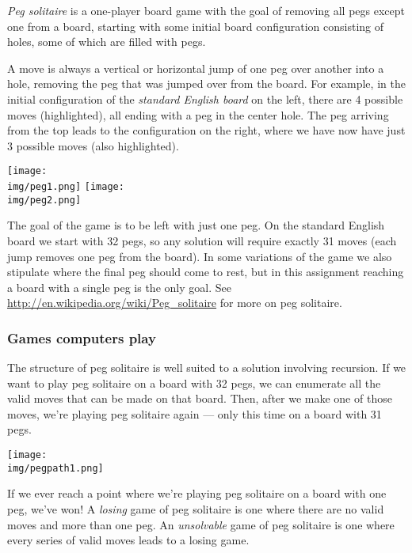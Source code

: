 \documentclass[12pt]{exam}
\begin{document}
\emph{Peg solitaire} is a one-player board game with the goal of
removing all pegs except one from a board, starting with some initial
board configuration consisting of holes, some of which are filled with
pegs.

A move is always a vertical or horizontal jump of one peg over another
into a hole, removing the peg that was jumped over from the board.
For example, in the initial configuration of the \emph{standard
  English board} on the left, there are 4 possible moves
(highlighted), all ending with a peg in the center hole.  The peg
arriving from the top leads to the configuration on the right, where
we have now have just 3 possible moves (also highlighted).
\begin{center}
\texttt{[image: \\img/peg1.png]}
\hspace{3em}
\texttt{[image: \\img/peg2.png]}
\end{center}

The goal of the game is to be left with just one peg. On the standard
English board we start with 32 pegs, so any solution will require
exactly 31 moves (each jump removes one peg from the board).  In some
variations of the game we also stipulate where the final peg should
come to rest, but in this assignment reaching a board with a single
peg is the only goal.  See
\url{http://en.wikipedia.org/wiki/Peg_solitaire} for more on peg
solitaire.


\enlargethispage{5ex}
\subsubsection*{Games computers play}

The structure of peg solitaire is well suited to a solution involving
recursion.  If we want to play peg solitaire on a board with 32 pegs,
we can enumerate all the valid moves that can be made on that
board. Then, after we make one of those moves, we're playing peg
solitaire again --- only this time on a board with 31 pegs.
\begin{center}
\texttt{[image: \\img/pegpath1.png]}
\end{center}
If we ever reach a point where we're playing peg solitaire on a board
with one peg, we've won! A \emph{losing} game
of peg solitaire is one where there are no valid moves and more than
one peg. An \emph{unsolvable} game of peg solitaire is one where every
series of valid moves leads to a losing game.


\newpage
\end{document}
